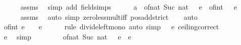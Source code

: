 \begin{isabellebody}
\ \ \ \ \ \ \isamarkupfalse%
\ assms\ \isamarkupfalse%
\ {\isacharparenleft}{\kern0pt}simp\ add{\isacharcolon}{\kern0pt}\ field{\isacharunderscore}{\kern0pt}simps{\isacharparenright}{\kern0pt}\isanewline
\ \ \ \ \isamarkupfalse%
\ {\isachardoublequoteopen}{\isacharparenleft}{\kern0pt}{}{\isacharcolon}{\kern0pt}{\isacharcolon}{\kern0pt}{\isacharprime}{\kern0pt}a{\isacharparenright}{\kern0pt}\ {\isacharless}{\kern0pt}\ of{\isacharunderscore}{\kern0pt}nat\ {\isacharparenleft}{\kern0pt}Suc\ {\isacharparenleft}{\kern0pt}nat\ {\isasymlceil}{}\ {\isacharslash}{\kern0pt}\ e{\isasymrceil}{\isacharparenright}{\kern0pt}{\isacharparenright}{\kern0pt}\ {\isacharasterisk}{\kern0pt}\ of{\isacharunderscore}{\kern0pt}int\ {\isasymlceil}{}\ {\isacharslash}{\kern0pt}\ e{\isasymrceil}{\isachardoublequoteclose}\isanewline
\ \ \ \ \ \ \isamarkupfalse%
\ assms\ \isamarkupfalse%
\ {\isacharparenleft}{\kern0pt}auto\ simp{\isacharcolon}{\kern0pt}\ zero{\isacharunderscore}{\kern0pt}less{\isacharunderscore}{\kern0pt}mult{\isacharunderscore}{\kern0pt}iff\ pos{\isacharunderscore}{\kern0pt}add{\isacharunderscore}{\kern0pt}strict{\isacharparenright}{\kern0pt}\isanewline
\ \ \isamarkupfalse%
\ auto\isanewline
\ \ \isamarkupfalse%
\ \isamarkupfalse%
\ {\isachardoublequoteopen}{}\ {\isacharslash}{\kern0pt}\ of{\isacharunderscore}{\kern0pt}int\ {\isacharparenleft}{\kern0pt}{\isasymlceil}{}{\isacharslash}{\kern0pt}e{\isasymrceil}{\isacharparenright}{\kern0pt}\ {\isasymle}\ {}\ {\isacharslash}{\kern0pt}\ {\isacharparenleft}{\kern0pt}{}{\isacharslash}{\kern0pt}e{\isacharparenright}{\kern0pt}{\isachardoublequoteclose}\isanewline
\ \ \ \ \isamarkupfalse%
\ {\isacharparenleft}{\kern0pt}rule\ divide{\isacharunderscore}{\kern0pt}left{\isacharunderscore}{\kern0pt}mono{\isacharparenright}{\kern0pt}\ {\isacharparenleft}{\kern0pt}auto\ simp{\isacharcolon}{\kern0pt}\ {\isacartoucheopen}{}\ {\isacharless}{\kern0pt}\ e{\isacartoucheclose}\ ceiling{\isacharunderscore}{\kern0pt}correct{\isacharparenright}{\kern0pt}\isanewline
\ \ \isamarkupfalse%
\ \isamarkupfalse%
\ {\isachardoublequoteopen}{\isasymdots}\ {\isacharequal}{\kern0pt}\ e{\isachardoublequoteclose}\ \isamarkupfalse%
\ simp\isanewline
\ \ \isamarkupfalse%
\ \isamarkupfalse%
\ \ {\isachardoublequoteopen}{}\ {\isacharslash}{\kern0pt}\ of{\isacharunderscore}{\kern0pt}nat\ {\isacharparenleft}{\kern0pt}Suc\ {\isacharparenleft}{\kern0pt}nat\ {\isasymlceil}{}\ {\isacharslash}{\kern0pt}\ e{\isasymrceil}{\isacharparenright}{\kern0pt}{\isacharparenright}{\kern0pt}\ {\isacharless}{\kern0pt}\ e{\isachardoublequoteclose}\isanewline

\end{isabellebody}
